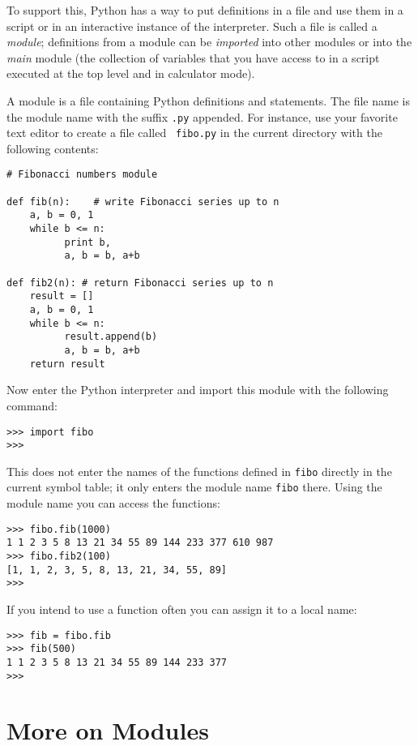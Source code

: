 To support this, Python has a way to put definitions in a file and use
them in a script or in an interactive instance of the interpreter.
Such a file is called a {\em module}; definitions from a module can be
{\em imported} into other modules or into the {\em main} module (the
collection of variables that you have access to in a script
executed at the top level
and in calculator mode).

A module is a file containing Python definitions and statements.  The
file name is the module name with the suffix {\tt .py} appended.  For
instance, use your favorite text editor to create a file called {\tt
fibo.py} in the current directory with the following contents:

\bcode\begin{verbatim}
# Fibonacci numbers module

def fib(n):    # write Fibonacci series up to n
    a, b = 0, 1
    while b <= n:
          print b,
          a, b = b, a+b

def fib2(n): # return Fibonacci series up to n
    result = []
    a, b = 0, 1
    while b <= n:
          result.append(b)
          a, b = b, a+b
    return result
\end{verbatim}\ecode
%
Now enter the Python interpreter and import this module with the
following command:

\bcode\begin{verbatim}
>>> import fibo
>>> 
\end{verbatim}\ecode
%
This does not enter the names of the functions defined in
{\tt fibo}
directly in the current symbol table; it only enters the module name
{\tt fibo}
there.
Using the module name you can access the functions:

\bcode\begin{verbatim}
>>> fibo.fib(1000)
1 1 2 3 5 8 13 21 34 55 89 144 233 377 610 987
>>> fibo.fib2(100)
[1, 1, 2, 3, 5, 8, 13, 21, 34, 55, 89]
>>> 
\end{verbatim}\ecode
%
If you intend to use a function often you can assign it to a local name:

\bcode\begin{verbatim}
>>> fib = fibo.fib
>>> fib(500)
1 1 2 3 5 8 13 21 34 55 89 144 233 377
>>> 
\end{verbatim}\ecode

\section{More on Modules}

